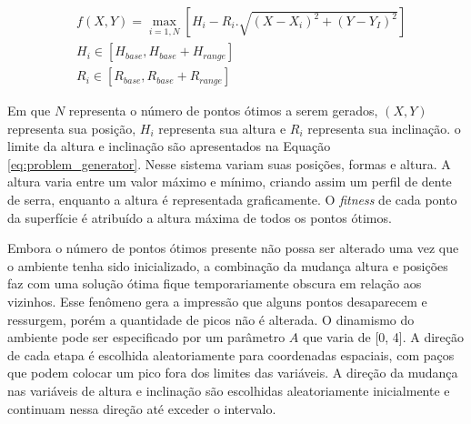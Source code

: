 \begin{equation}
\label{eq:problem_generator}
\begin{split}
& f(X,Y) = \max_{i=1,N}\left[H_i - R_i . \sqrt{(X - X_i)^2 + (Y - Y_I)^2}\right] \\
& H_i \in [H_{base}, H_{base} + H_{range}] \\
& R_i \in [R_{base}, R_{base} + R_{range}]
\end{split}
\end{equation}

\noindent Em que $N$ representa o número de pontos ótimos a serem gerados, $(X,Y)$ representa sua posição, $H_i$ representa sua altura e $R_i$ representa sua inclinação. o limite da altura e inclinação são apresentados na Equação \ref{eq:problem_generator}. Nesse sistema variam suas posições, formas e altura. A altura varia entre um valor máximo e mínimo, criando assim um perfil de dente de serra, enquanto a altura é representada graficamente. O \textit{fitness} de cada ponto da superfície é atribuído a altura máxima de todos os pontos ótimos.

Embora o número de pontos ótimos presente não possa ser alterado uma vez que o ambiente tenha sido inicializado, a combinação da mudança altura e posições faz com uma solução ótima fique temporariamente obscura em relação aos vizinhos. Esse fenômeno gera a impressão que alguns pontos desaparecem e ressurgem, porém a quantidade de picos não é alterada. O dinamismo do ambiente pode ser especificado por um parâmetro $A$ que varia de [0, 4]. A direção de cada etapa é escolhida aleatoriamente para coordenadas espaciais, com paços que podem colocar um pico fora dos limites das variáveis. A direção da mudança nas variáveis de altura e inclinação são escolhidas aleatoriamente inicialmente e continuam nessa direção até exceder o intervalo.